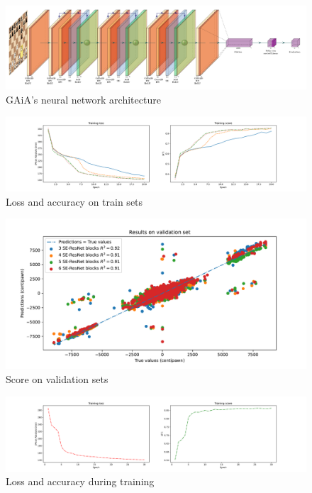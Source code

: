 \documentclass[a4paper]{article}
\begin{document}
\begin{figure}[H]
  \centering
  \includegraphics[width=13cm]{network/network.pdf}
  \caption{GAiA's neural network architecture}
  \label{fig:model_archi}
\end{figure}

\begin{figure}[H]
  \centering
  \includegraphics[width=15cm]{model_selection_1.pdf}
  \caption{Loss and accuracy on train sets}
  \label{fig:acc_loss}
\end{figure}

\begin{figure}[H]
  \centering
  \includegraphics[width=13cm]{model_selection_2.pdf}
  \caption{Score on validation sets}
  \label{fig:score_valid}
\end{figure}

\begin{figure}[H]
  \centering
  \includegraphics[width=15cm]{GAiA_history.pdf}
  \caption{Loss and accuracy during training}
  \label{fig:history}
\end{figure}
\end{document}
